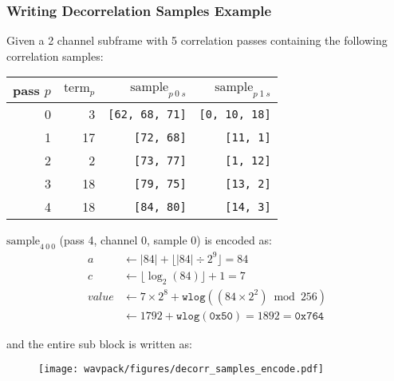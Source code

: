 \subsubsection{Writing Decorrelation Samples Example}
Given a 2 channel subframe with 5 correlation passes containing
the following correlation samples:
\begin{table}[h]
\begin{tabular}{rrrr}
pass $p$ & $\text{term}_p$ & $\text{sample}_{p~0~s}$ & $\text{sample}_{p~1~s}$ \\
\hline
0 & 3 & \texttt{[62, 68, 71]} & \texttt{[0, 10, 18]} \\
1 & 17 & \texttt{[72, 68]} & \texttt{[11, 1]} \\
2 & 2 & \texttt{[73, 77]} & \texttt{[1, 12]} \\
3 & 18 & \texttt{[79, 75]} & \texttt{[13, 2]} \\
4 & 18 & \texttt{[84, 80]} & \texttt{[14, 3]} \\
\end{tabular}
\end{table}
\par
\noindent
$\text{sample}_{4~0~0}$ (pass 4, channel 0, sample 0) is encoded as:
\begin{align*}
a &\leftarrow |84| + \lfloor|84| \div 2 ^ 9\rfloor = 84 \\
c &\leftarrow \lfloor\log_2(84)\rfloor + 1 = 7 \\
value &\leftarrow 7 \times 2 ^ 8 + \texttt{wlog}((84 \times 2 ^ 2) \bmod 256) \\
&\leftarrow 1792 + \texttt{wlog}(\texttt{0x50}) = 1892 = \texttt{0x764}
\end{align*}
\par
\noindent
and the entire sub block is written as:
\begin{figure}[h]
\texttt{[image: wavpack/figures/decorr\_samples\_encode.pdf]}
\end{figure}
